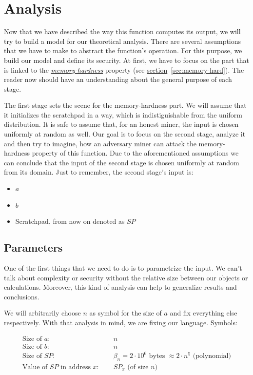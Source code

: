 \section{Analysis} \label{sec:analysis}
Now that we have described the way this function computes its output, we will try to build a model for our theoretical analysis. There are several assumptions that we have to make to abstract the function's operation. For this purpose, we build our model and define its security. At first, we have to focus on the part that is linked to the \hyperref[sec:memory-hard]{\emph{memory-hardness}} property (see \hyperref[sec:memory-hard]{section}~\ref{sec:memory-hard}). The reader now should have an understanding about the general purpose of each stage.

The first stage sets the scene for the memory-hardness part. We will assume that it initializes the scratchpad in a way, which is indistiguishable from the uniform distribution. It is safe to assume that, for an honest miner, the input is chosen uniformly at random as well. Our goal is to focus on the second stage, analyze it and then try to imagine, how an adversary miner can attack the memory-hardness property of this function. Due to the aforementioned assumptions we can conclude that the input of the second stage is chosen uniformly at random from its domain. Just to remember, the second stage's input is:
\begin{itemize}
  \item $a$
  \item $b$
  \item Scratchpad, from now on denoted as $SP$
\end{itemize}

\subsection{Parameters}
One of the first things that we need to do is to parametrize the input. We can't talk about complexity or security without the relative size between our objects or calculations. Moreover, this kind of analysis can help to generalize results and conclusions.

We will arbitrarily choose $n$ as symbol for the size of $a$ and fix everything else respectively. With that analysis in mind, we are fixing our language. Symbols:

\[
  \begin{array}{lcl}
    \mbox{Size of }a \mbox{: } & \: & n \\
    \mbox{Size of }b \mbox{: } & \: & n \\
    \mbox{Size of }SP \mbox{: } & \: & \beta_{n} = 2 \cdot 10^{6} \mbox{ bytes } \approx 2 \cdot n^{5} \mbox{ (polynomial)} \\
    \mbox{Value of }SP \mbox{ in address }x \mbox{: } & \: & SP_{x} \mbox{ (of size }n\mbox{)} \\
  \end{array}
\]

